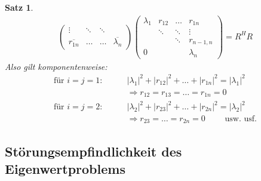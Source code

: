 \documentclass[%
a4paper,
11pt,		%
leqno,		%
]
{scrartcl}
\theoremstyle{plain}
\theoremstyle{plain}
\newtheorem{mysatz}[mydef]{Satz}
\theoremstyle{plain}
\theoremstyle{plain}
\begin{document}
\begin{mysatz}
\begin{align*}
\begin{pmatrix}
\vdots                  & \ddots & \ddots\\
\overline{r_{1n}}       & \dots & \dots & \overline{\lambda_n}
\end{pmatrix}
\begin{pmatrix}
\lambda_1   & r_{12}    & \dots     & r_{1n}\\
            & \ddots    & \ddots    & \vdots\\
            &           & \ddots    & r_{n-1,n}\\
0           &           &           & \lambda_n
\end{pmatrix}
= R^H R
\end{align*}
Also gilt komponentenweise:
\begin{align*}
\text{für } i=j=1: \qquad & |\lambda_1|^2 + |r_{12}|^2 + \dots + |r_{1n}|^2 = |\lambda_1|^2\\
& \Rightarrow r_{12} = r_{13} = \dots = r_{1n} = 0\\
\text{für } i=j=2: \qquad & |\lambda_2|^2 + |r_{23}|^2 + \dots + |r_{2n}|^2 = |\lambda_2|^2\\
& \Rightarrow r_{23} = \dots = r_{2n} = 0 \qquad \text{ usw. usf.}
\end{align*}
\end{mysatz}


\subsection{Störungsempfindlichkeit des Eigenwertproblems} %
\label{sub:Störungsempfindlichkeit des Eigenwertproblems}
\end{document}

